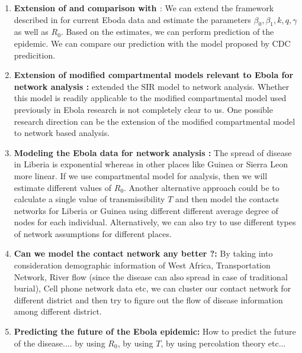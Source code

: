 \documentclass[12pt, journal,onecolumn]{IEEEtran}
\begin{document}
\begin{enumerate}
\item \textbf{Extension of \cite{chowell2004basic} and comparison with \cite{meltzer2014estimating}}: We can extend the framework described in \cite{chowell2004basic} for current Eboda data and estimate the parameters $\beta_0, \beta_1, k, q, \gamma$ as well as $R_0$. Based on the estimates, we can perform prediction of the epidemic. We can compare our prediction with the model proposed by CDC \cite{meltzer2014estimating} predicition.

\item \textbf{Extension of modified compartmental models relevant to Ebola for network analysis : } \cite{newman2002spread, meyers2005network} extended the SIR model to network analysis. Whether this model is readily applicable to the modified compartmental model used previously in Ebola research \cite{chowell2004basic, legrand2007understanding} is not completely clear to us. One possible research direction can be the extension of the modified compartmental model to network based analysis.

\item \textbf{Modeling the Ebola data for network analysis : } The spread of disease in Liberia is exponential whereas in other places like Guinea or Sierra Leon more linear. If we use compartmental model for analysis, then we will estimate different values of $R_0$. Another alternative approach could be to calculate a single value of transmissibility $T$ and then model the contacts networks for Liberia or Guinea using different different average degree of nodes for each individual. Alternatively, we can also try to use different types of network assumptions for different places.

\item \textbf{Can we model the contact network any better ?:} By taking into consideration demographic information of West Africa, Transportation Network, River flow (since the disease can also spread in case of traditional burial), Cell phone network data etc, we can cluster our contact network  for different district and then try to figure out the flow of disease information among different district.

\item \textbf{Predicting the future of the Ebola epidemic: } How to predict the future of the disease.... by using $R_0$, by using $T$, by using percolation theory etc...



\end{enumerate}
\end{document}
